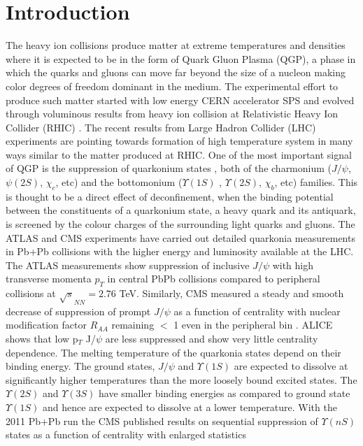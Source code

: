 \documentclass[aps,prc,preprint,superscriptaddress,showpacs,showkeys]{revtex4-1}
\begin{document}
\section{Introduction}
   The heavy ion collisions produce matter at extreme temperatures and densities where 
it is expected to be in the form of Quark Gluon Plasma 
(QGP), a phase in which the quarks and gluons can move far beyond  the size of a nucleon 
making color degrees of freedom dominant in the medium. 
  The experimental effort to produce such matter started with low energy CERN accelerator 
SPS and evolved through voluminous results from heavy ion collision at Relativistic Heavy Ion 
Collider (RHIC) \cite{INTRO}.
 The recent results from Large Hadron Collider (LHC) experiments \cite{QGP_Tc} are 
pointing towards formation of high temperature system in many ways similar to the matter
produced at RHIC. 
  One of the most important signal of QGP is the suppression of 
quarkonium states \cite{SATZ}, both of the charmonium ($J/\psi$, $\psi(2S)$, $\chi_{c}$, etc) 
and the bottomonium ($\Upsilon(1S)$ , $\Upsilon(2S)$, $\chi_{b}$, etc) families. This is thought to be a 
direct effect of deconfinement, when the binding potential between the constituents of a quarkonium state, 
a heavy quark and its antiquark, is screened by the colour charges of the surrounding light quarks and gluons. 
  The ATLAS and CMS experiments have carried out detailed quarkonia measurements in Pb+Pb collisions 
with the higher energy and luminosity available at the LHC.
 The ATLAS measurements \cite{ATLAS} show suppression of inclusive $J/\psi$ with high transverse momenta $p_T$  
in central PbPb collisions compared to peripheral collisions at $\sqrt s_{NN} = 2.76$ TeV. 
  Similarly, CMS measured a steady and smooth decrease of suppression 
of prompt $J/\psi$ as a function of centrality with nuclear modification factor $R_{AA}$ remaining $<$ 1 even 
in the peripheral bin \cite{JCMS,CMSJPsi}. ALICE shows that low p$_T$ J/$\psi$ are less suppressed and show very 
little centrality dependence\cite{ALICEJPsi}.
  The melting temperature of the quarkonia states depend on their binding energy. The ground states, 
$J/\psi$ and $\Upsilon(1S)$ are expected to dissolve at significantly higher temperatures than the 
more loosely bound excited states. 
   The $\Upsilon(2S)$ and $\Upsilon(3S)$ have smaller binding energies as compared to ground
state $\Upsilon(1S)$ and hence are expected to dissolve at a lower temperature. 
 With the 2011 Pb+Pb run the CMS published results on sequential suppression of 
$\Upsilon(nS)$ states as a function of centrality \cite{CMSU2} with enlarged statistics
\end{document}
